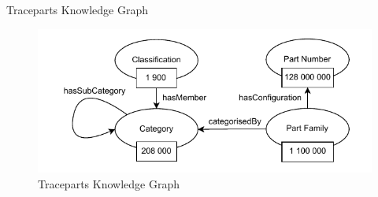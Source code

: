 






\begin{frame}{Traceparts Knowledge Graph}

    \begin{figure} [H]
        \begin{center}
            \includegraphics[scale=0.8]{images/tp_kg.pdf} 
            \caption{Traceparts Knowledge Graph} 
        \end{center}
    \end{figure}

\end{frame}

